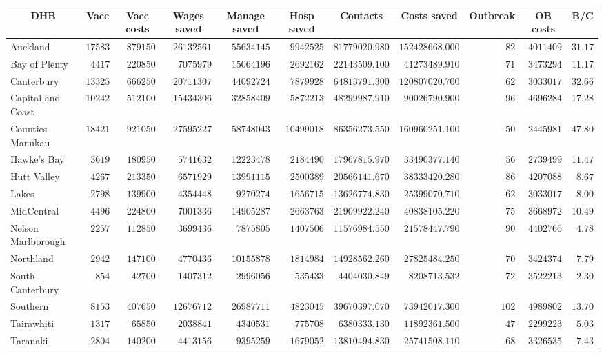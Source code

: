 \documentclass{article}
\begin{document}
\begin{table}\small
\begin{center}
\begin{tabular}{lrrrrrrrrrr}
\hline\hline
\multicolumn{1}{c}{DHB}&\multicolumn{1}{c}{Vacc}&\multicolumn{1}{c}{Vacc costs}&\multicolumn{1}{c}{Wages saved}&\multicolumn{1}{c}{Manage saved}&\multicolumn{1}{c}{Hosp saved}&\multicolumn{1}{c}{Contacts}&\multicolumn{1}{c}{Costs saved}&\multicolumn{1}{c}{Outbreak}&\multicolumn{1}{c}{OB costs}&\multicolumn{1}{c}{B/C}\tabularnewline
\hline
Auckland&$17583$&$879150$&$26132561$&$55634145$&$ 9942525$&$81779020.980$&$152428668.000$&$ 82$&$4011409$&$31.17$\tabularnewline
Bay of Plenty&$ 4417$&$220850$&$ 7075979$&$15064196$&$ 2692162$&$22143509.100$&$ 41273489.910$&$ 71$&$3473294$&$11.17$\tabularnewline
Canterbury&$13325$&$666250$&$20711307$&$44092724$&$ 7879928$&$64813791.300$&$120807020.700$&$ 62$&$3033017$&$32.66$\tabularnewline
Capital and Coast&$10242$&$512100$&$15434306$&$32858409$&$ 5872213$&$48299987.910$&$ 90026790.900$&$ 96$&$4696284$&$17.28$\tabularnewline
Counties Manukau&$18421$&$921050$&$27595227$&$58748043$&$10499018$&$86356273.550$&$160960251.100$&$ 50$&$2445981$&$47.80$\tabularnewline
Hawke's Bay&$ 3619$&$180950$&$ 5741632$&$12223478$&$ 2184490$&$17967815.970$&$ 33490377.140$&$ 56$&$2739499$&$11.47$\tabularnewline
Hutt Valley&$ 4267$&$213350$&$ 6571929$&$13991115$&$ 2500389$&$20566141.670$&$ 38333420.280$&$ 86$&$4207088$&$ 8.67$\tabularnewline
Lakes&$ 2798$&$139900$&$ 4354448$&$ 9270274$&$ 1656715$&$13626774.830$&$ 25399070.710$&$ 62$&$3033017$&$ 8.00$\tabularnewline
MidCentral&$ 4496$&$224800$&$ 7001336$&$14905287$&$ 2663763$&$21909922.240$&$ 40838105.220$&$ 75$&$3668972$&$10.49$\tabularnewline
Nelson Marlborough&$ 2257$&$112850$&$ 3699436$&$ 7875805$&$ 1407506$&$11576984.550$&$ 21578447.790$&$ 90$&$4402766$&$ 4.78$\tabularnewline
Northland&$ 2942$&$147100$&$ 4770436$&$10155878$&$ 1814984$&$14928562.260$&$ 27825484.250$&$ 70$&$3424374$&$ 7.79$\tabularnewline
South Canterbury&$  854$&$ 42700$&$ 1407312$&$ 2996056$&$  535433$&$ 4404030.849$&$  8208713.532$&$ 72$&$3522213$&$ 2.30$\tabularnewline
Southern&$ 8153$&$407650$&$12676712$&$26987711$&$ 4823045$&$39670397.070$&$ 73942017.300$&$102$&$4989802$&$13.70$\tabularnewline
Tairawhiti&$ 1317$&$ 65850$&$ 2038841$&$ 4340531$&$  775708$&$ 6380333.130$&$ 11892361.500$&$ 47$&$2299223$&$ 5.03$\tabularnewline
Taranaki&$ 2804$&$140200$&$ 4413156$&$ 9395259$&$ 1679052$&$13810494.830$&$ 25741508.110$&$ 68$&$3326535$&$ 7.43$\tabularnewline

\end{tabular}
\end{center}
\end{table}
\end{document}
